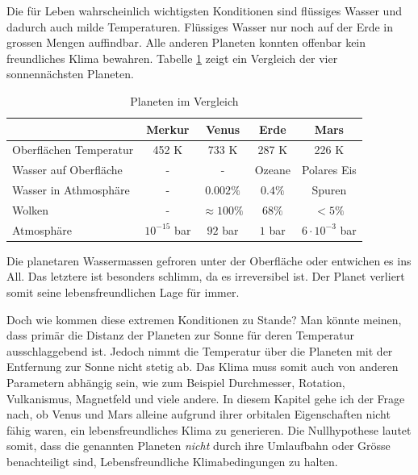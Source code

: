 \begin{refsection}
Die für Leben wahrscheinlich wichtigsten Konditionen sind flüssiges Wasser und dadurch auch milde Temperaturen. Flüssiges Wasser nur noch auf der Erde in grossen Mengen auffindbar.
Alle anderen Planeten konnten offenbar kein freundliches Klima bewahren. Tabelle \ref{planeten_comparison} zeigt ein Vergleich der vier sonnennächsten Planeten.
\begin{center}
\begin{table}
	\center
	\begin{tabular}{l|c c c c}
							& Merkur			& Venus				& Erde		& Mars                  \\
  \hline
  Oberflächen Temperatur	& 452 K				& 733 K				& 287 K		& 226 K                 \\
  Wasser auf Oberfläche		& -					& -					& Ozeane	& Polares Eis			\\
  Wasser in Athmosphäre		& -					& $0.002\%$ 		& $0.4\%$	& Spuren				\\
  Wolken					& -					& $\approx100\%$	& $68\%$  	& $<5\%$                \\
  Atmosphäre				& $10^{-15}$ bar	& $92$ bar			& $1$ bar	& $6 \cdot 10^{-3}$ bar 
\end{tabular}
\caption{Planeten im Vergleich}
\label{planeten_comparison}
\end{table}
\end{center}
Die planetaren Wassermassen gefroren unter der Oberfläche oder entwichen es ins All. Das letztere ist besonders schlimm, da es irreversibel ist. Der Planet verliert somit seine lebensfreundlichen Lage für immer.

Doch wie kommen diese extremen Konditionen zu Stande? Man könnte meinen, dass primär die Distanz der Planeten zur Sonne für deren Temperatur ausschlaggebend ist. Jedoch nimmt die Temperatur über die Planeten mit der Entfernung zur Sonne nicht stetig ab.
Das Klima muss somit auch von anderen Parametern abhängig sein, wie zum Beispiel Durchmesser, Rotation, Vulkanismus, Magnetfeld und viele andere.
In diesem Kapitel gehe ich der Frage nach, ob Venus und Mars alleine aufgrund ihrer orbitalen Eigenschaften nicht fähig waren, ein lebensfreundliches Klima zu generieren. Die Nullhypothese lautet somit, dass die genannten Planeten \textit{nicht} durch ihre Umlaufbahn oder Grösse benachteiligt sind, Lebensfreundliche Klimabedingungen zu halten.


\end{refsection}
